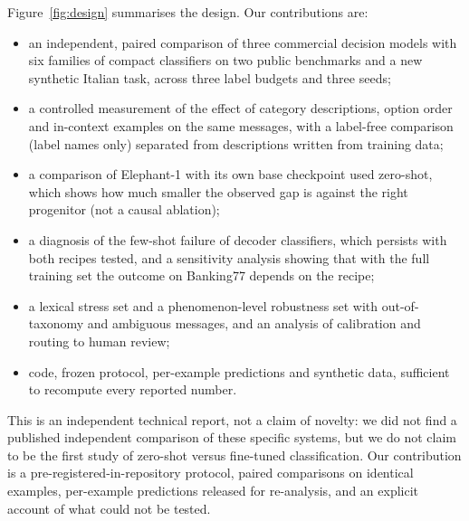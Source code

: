 Figure~\ref{fig:design} summarises the design. Our contributions are:
\begin{itemize}
  \item an independent, paired comparison of three commercial decision models with six families of compact classifiers on two
  public benchmarks and a new synthetic Italian task, across three label budgets and three seeds;
  \item a controlled measurement of the effect of category descriptions, option order and in-context examples on the same messages,
  with a label-free comparison (label names only) separated from descriptions written from training data;
  \item a comparison of Elephant-1 with its own base checkpoint used zero-shot, which shows how much smaller the observed gap is
  against the right progenitor (not a causal ablation);
  \item a diagnosis of the few-shot failure of decoder classifiers, which persists with both recipes tested, and a sensitivity
  analysis showing that with the full training set the outcome on Banking77 depends on the recipe;
  \item a lexical stress set and a phenomenon-level robustness set with out-of-taxonomy and ambiguous messages, and an analysis of
  calibration and routing to human review;
  \item code, frozen protocol, per-example predictions and synthetic data, sufficient to recompute every reported number.
\end{itemize}



This is an independent technical report, not a claim of novelty: we did not find a published independent comparison of these
specific systems, but we do not claim to be the first study of zero-shot versus fine-tuned classification. Our contribution is a
pre-registered-in-repository protocol, paired comparisons on identical examples, per-example predictions released for
re-analysis, and an explicit account of what could not be tested.
